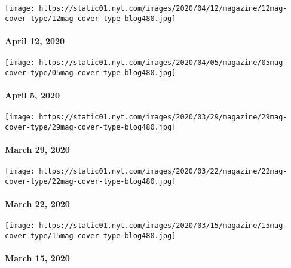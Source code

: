 \href{https://www.nytimes.com/issue/magazine/2020/04/10/the-41220-issue}{}

\texttt{[image: https://static01.nyt.com/images/2020/04/12/magazine/12mag-cover-type/12mag-cover-type-blog480.jpg]}

\hypertarget{april-12-2020}{%
\paragraph{April 12, 2020}\label{april-12-2020}}

\href{https://www.nytimes.com/issue/magazine/2020/04/03/the-4520-issue}{}

\texttt{[image: https://static01.nyt.com/images/2020/04/05/magazine/05mag-cover-type/05mag-cover-type-blog480.jpg]}

\hypertarget{april-5-2020}{%
\paragraph{April 5, 2020}\label{april-5-2020}}

\href{https://www.nytimes.com/issue/magazine/2020/03/27/the-32920-issue}{}

\texttt{[image: https://static01.nyt.com/images/2020/03/29/magazine/29mag-cover-type/29mag-cover-type-blog480.jpg]}

\hypertarget{march-29-2020}{%
\paragraph{March 29, 2020}\label{march-29-2020}}

\href{https://www.nytimes.com/issue/magazine/2020/03/19/the-32220-issue}{}

\texttt{[image: https://static01.nyt.com/images/2020/03/22/magazine/22mag-cover-type/22mag-cover-type-blog480.jpg]}

\hypertarget{march-22-2020}{%
\paragraph{March 22, 2020}\label{march-22-2020}}

\href{https://www.nytimes.com/interactive/2020/03/11/magazine/best-songs.html\#cover}{}

\texttt{[image: https://static01.nyt.com/images/2020/03/15/magazine/15mag-cover-type/15mag-cover-type-blog480.jpg]}

\hypertarget{march-15-2020}{%
\paragraph{March 15, 2020}\label{march-15-2020}}

